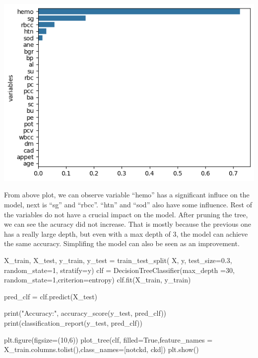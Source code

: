 \documentclass[
  11pt,
  letterpaper,
  DIV=11,
  numbers=noendperiod]{scrartcl}
\newenvironment{Shaded}{\begin{snugshade}}{\end{snugshade}}
\newcommand{\BuiltInTok}[1]{\textcolor[rgb]{0.00,0.23,0.31}{#1}}
\newcommand{\DecValTok}[1]{\textcolor[rgb]{0.68,0.00,0.00}{#1}}
\newcommand{\FloatTok}[1]{\textcolor[rgb]{0.68,0.00,0.00}{#1}}
\newcommand{\NormalTok}[1]{\textcolor[rgb]{0.00,0.23,0.31}{#1}}
\newcommand{\OperatorTok}[1]{\textcolor[rgb]{0.37,0.37,0.37}{#1}}
\newcommand{\StringTok}[1]{\textcolor[rgb]{0.13,0.47,0.30}{#1}}
\newcommand{\VariableTok}[1]{\textcolor[rgb]{0.07,0.07,0.07}{#1}}
\begin{document}
\includegraphics{Assignment6_Final version_files/figure-pdf/cell-34-output-1.png}

From above plot, we can observe variable ``hemo'' has a significant
influce on the model, next is ``sg'' and ``rbcc''. ``htn'' and ``sod''
also have some influence. Rest of the variables do not have a crucial
impact on the model. After pruning the tree, we can see the acuracy did
not increase. That is mostly because the previous one has a really large
depth, but even with a max depth of 3, the model can achieve the same
accuracy. Simplifing the model can also be seen as an improvement.

\begin{Shaded}
\begin{Highlighting}[]

\NormalTok{X\_train, X\_test, y\_train, y\_test }\OperatorTok{=}\NormalTok{ train\_test\_split(}
\NormalTok{    X, y, test\_size}\OperatorTok{=}\FloatTok{0.3}\NormalTok{, random\_state}\OperatorTok{=}\DecValTok{1}\NormalTok{, stratify}\OperatorTok{=}\NormalTok{y)}
\NormalTok{clf }\OperatorTok{=}\NormalTok{ DecisionTreeClassifier(max\_depth }\OperatorTok{=}\DecValTok{30}\NormalTok{, }
\NormalTok{    random\_state}\OperatorTok{=}\DecValTok{1}\NormalTok{,criterion}\OperatorTok{=}\StringTok{\textquotesingle{}entropy\textquotesingle{}}\NormalTok{)  }
\NormalTok{clf.fit(X\_train, y\_train)}


\NormalTok{pred\_clf }\OperatorTok{=}\NormalTok{ clf.predict(X\_test)}


\BuiltInTok{print}\NormalTok{(}\StringTok{"Accuracy:"}\NormalTok{, accuracy\_score(y\_test, pred\_clf))}
\BuiltInTok{print}\NormalTok{(classification\_report(y\_test, pred\_clf))}


\NormalTok{plt.figure(figsize}\OperatorTok{=}\NormalTok{(}\DecValTok{10}\NormalTok{,}\DecValTok{6}\NormalTok{))}
\NormalTok{plot\_tree(clf, filled}\OperatorTok{=}\VariableTok{True}\NormalTok{,feature\_names }\OperatorTok{=}\NormalTok{ X\_train.columns.tolist(),class\_names}\OperatorTok{=}\NormalTok{[}\StringTok{\textquotesingle{}notckd\textquotesingle{}}\NormalTok{, }\StringTok{\textquotesingle{}ckd\textquotesingle{}}\NormalTok{])}
\NormalTok{plt.show()}
\end{Highlighting}
\end{Shaded}
\end{document}
